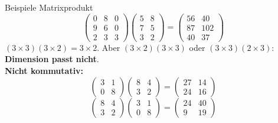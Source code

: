 \documentclass[a4paper, fontsize=7pt]{scrartcl}
\renewcommand*{\arraystretch}{1.5}  %
\begin{document}
\begin{subbox}{Beispiele Matrixprodukt}
\renewcommand*{\arraystretch}{1.05}
$$\begin{pmatrix} 0 & 8 & 0\\ 9 & 6 & 0\\ 2 & 3 & 3 \end{pmatrix}
\begin{pmatrix} 5 & 8\\ 7 & 5\\ 3 & 2 \end{pmatrix}
= \begin{pmatrix} 56 & 40\\ 87 & 102\\ 40 & 37 \end{pmatrix}$$
$(3 \times 3)(3 \times 2) = 3 \times 2$. Aber
$(3 \times 2)(3 \times 3)$ oder $(3 \times 3)(2 \times 3)$:
\textbf{Dimension passt nicht}.\\[2pt]
\textbf{Nicht kommutativ:}
$$\begin{pmatrix} 3 & 1\\ 0 & 8 \end{pmatrix}
\begin{pmatrix} 8 & 4\\ 3 & 2 \end{pmatrix}
= \begin{pmatrix} 27 & 14\\ 24 & 16 \end{pmatrix}$$
$$\begin{pmatrix} 8 & 4\\ 3 & 2 \end{pmatrix}
\begin{pmatrix} 3 & 1\\ 0 & 8 \end{pmatrix}
= \begin{pmatrix} 24 & 40\\ 9 & 19 \end{pmatrix}$$
\end{subbox}
\end{document}
